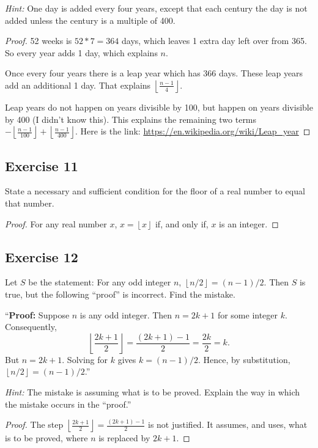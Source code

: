 \documentclass[14pt]{extarticle}
\newcommand{\floor}[1]{{\left\lfloor#1\right\rfloor}}
\begin{document}
    {\it Hint:} One day is added every four years, except that each century the day is not added unless the century is a multiple of 400.

\begin{proof}
    52 weeks is $52 * 7 = 364$ days, which leaves 1 extra day left over from 365. So every year adds 1 day, which explains $n$.

    Once every four years there is a leap year which has 366 days. These leap years add an additional 1 day. That explains $\floor{\frac{n-1}{4}}$.

    Leap years do not happen on years divisible by 100, but happen on years divisible by 400 (I didn't know this). This explains the remaining two terms $-\floor{\frac{n-1}{100}} + \floor{\frac{n-1}{400}}$. Here is the link: \url{https://en.wikipedia.org/wiki/Leap_year}
\end{proof}

\subsection{Exercise 11}
State a necessary and sufficient condition for the floor of a real number to equal that number.

\begin{proof}
    For any real number $x$, $x = \floor{x}$ if, and only if, $x$ is an integer.
\end{proof}

\subsection{Exercise 12}
Let $S$ be the statement: For any odd integer $n$, $\floor{n/2} = (n - 1)/2$. Then $S$ is true, but the following “proof” is incorrect. Find the mistake.

“{\bf Proof:} Suppose $n$ is any odd integer. Then $n = 2k + 1$ for some integer $k$. Consequently,
\[
    \floor{\frac{2k+1}{2}} = \frac{(2k+1)-1}{2} = \frac{2k}{2} = k.
\]
But $n = 2k + 1$. Solving for $k$ gives $k = (n - 1)/2$.
Hence, by substitution, $\floor{n/2} = (n - 1)/2$.”

{\it Hint:} The mistake is assuming what is to be proved. Explain the way in which the mistake occurs in the “proof.”

\begin{proof}
    The step $\floor{\frac{2k+1}{2}} = \frac{(2k+1)-1}{2}$ is not justified. It assumes, and uses, what is to be proved, where $n$ is replaced by $2k+1$.
\end{proof}
\end{document}
